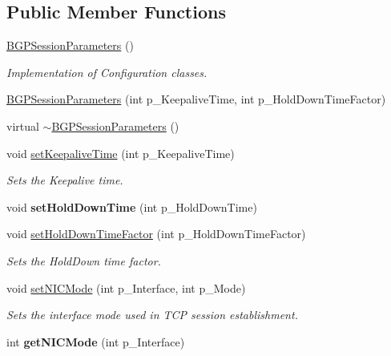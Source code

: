 \subsection*{Public Member Functions}
\begin{DoxyCompactItemize}
\item 
\hyperlink{classBGPSessionParameters_ae3d4f579822be095d01bfd4cab18033e}{B\-G\-P\-Session\-Parameters} ()
\begin{DoxyCompactList}\small\item\em Implementation of Configuration classes. \end{DoxyCompactList}\item 
\hyperlink{classBGPSessionParameters_a11f44412906552a220daff73da0c1992}{B\-G\-P\-Session\-Parameters} (int p\-\_\-\-Keepalive\-Time, int p\-\_\-\-Hold\-Down\-Time\-Factor)
\item 
virtual \hyperlink{classBGPSessionParameters_a3f2dc608214dc93d33862c194be3fbee}{$\sim$\-B\-G\-P\-Session\-Parameters} ()
\item 
void \hyperlink{classBGPSessionParameters_af9feb193d7de00f2e44d9866dc7c7100}{set\-Keepalive\-Time} (int p\-\_\-\-Keepalive\-Time)
\begin{DoxyCompactList}\small\item\em Sets the Keepalive time. \end{DoxyCompactList}\item 
\hypertarget{classBGPSessionParameters_a4164a26b4457a22e93fd78f098c1691c}{void {\bfseries set\-Hold\-Down\-Time} (int p\-\_\-\-Hold\-Down\-Time)}\label{classBGPSessionParameters_a4164a26b4457a22e93fd78f098c1691c}

\item 
void \hyperlink{classBGPSessionParameters_a9ecde9c6514a451337b8f3043268286e}{set\-Hold\-Down\-Time\-Factor} (int p\-\_\-\-Hold\-Down\-Time\-Factor)
\begin{DoxyCompactList}\small\item\em Sets the Hold\-Down time factor. \end{DoxyCompactList}\item 
void \hyperlink{classBGPSessionParameters_a7348f562b2c3a6acec49cf2d10c535b1}{set\-N\-I\-C\-Mode} (int p\-\_\-\-Interface, int p\-\_\-\-Mode)
\begin{DoxyCompactList}\small\item\em Sets the interface mode used in T\-C\-P session establishment. \end{DoxyCompactList}\item 
\hypertarget{classBGPSessionParameters_abbb9bf5608aa7a47047496bf2a04d46e}{int {\bfseries get\-N\-I\-C\-Mode} (int p\-\_\-\-Interface)}\label{classBGPSessionParameters_abbb9bf5608aa7a47047496bf2a04d46e}


\end{DoxyCompactItemize}
